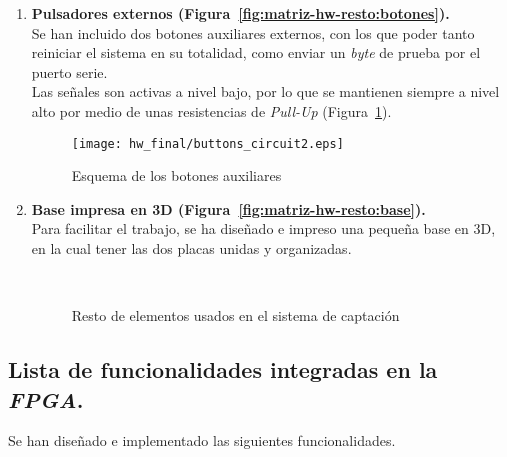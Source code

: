 \begin{enumerate}
    \item \textbf{Pulsadores externos (Figura~\ref{fig:matriz-hw-resto:botones}).} \\
    Se han incluido dos botones auxiliares externos, con los que poder tanto reiniciar el sistema en su totalidad, como enviar un \emph{byte} de prueba por el puerto serie. \\
    Las señales son activas a nivel bajo, por lo que se mantienen siempre a nivel alto por medio de unas resistencias de \emph{Pull-Up} (Figura~\ref{fig:buttons_circuit}).

    \begin{figure}[h]
        \centering
        \texttt{[image: hw\_final/buttons\_circuit2.eps]}
        \caption{Esquema de los botones auxiliares}
        \label{fig:buttons_circuit}
    \end{figure}

    \item \textbf{Base impresa en 3D (Figura~\ref{fig:matriz-hw-resto:base}).} \\
    Para facilitar el trabajo, se ha diseñado e impreso una pequeña base en 3D, en la cual tener las dos placas unidas y organizadas.

    \begin{figure}[htbp]
        \centering
         \\
        \caption{Resto de elementos usados en el sistema de captación} 
        \label{fig:matriz-hw-resto}
    \end{figure}
\end{enumerate}


\subsection{Lista de funcionalidades integradas en la \emph{FPGA}.}
Se han diseñado e implementado las siguientes funcionalidades.

